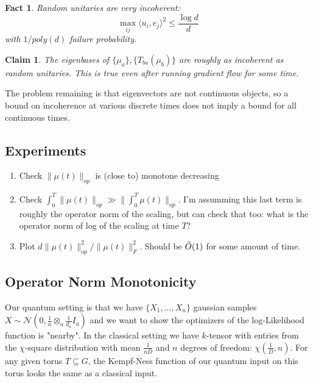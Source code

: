 \documentclass{article}
\newtheorem{fact}[theorem]{Fact}
\newtheorem{claim}[theorem]{Claim}
\newcommand\cN{\mathcal{N}}
\begin{document}
\begin{fact}
Random unitaries are very incoherent:
\[ \max_{ij} \langle u_{i}, e_{j} \rangle^{2} \leq \frac{\log d}{d}    \]
with $1/poly(d)$ failure probability.
\end{fact}

\begin{claim}
The eigenbases of $\{\mu_{a}\}, \{T_{ba}(\mu_{b})\}$ are roughly as incoherent as random unitaries. This is true even after running gradient flow for some time.
\end{claim}

The problem remaining is that eigenvectors are not continuous objects, so a bound on incoherence at various discrete times does not imply a bound for all continuous times.







\subsection{Experiments}
\begin{enumerate}
    \item Check $\|\mu(t)\|_{op}$ is (close to) monotone decreasing
    \item Check $\int_{0}^{T} \|\mu(t)\|_{op} \gg \|\int_{0}^{T} \mu(t)\|_{op}$. I'm assumming this last term is roughly the operator norm of the scaling, but can check that too: what is the operator norm of log of the scaling at time $T$?
    \item Plot $d \|\mu(t)\|_{op}^{2} / \|\mu(t)\|_{F}^{2}$. Should be $\Tilde{O}(1)$ for some amount of time.
\end{enumerate}


\subsection{Operator Norm Monotonicity}

Our quantum setting is that we have $\{X_{1}, ..., X_{n}\}$ gaussian samples $X \sim \cN(0, \frac{1}{n} \otimes_{a} \frac{1}{d_{a}} I_{a})$ and we want to show the optimizers of the log-Likelihood function is "nearby". In the classical setting we have $k$-tensor with entries from the $\chi$-square distribution with mean $\frac{1}{nD}$ and $n$ degrees of freedom: $\chi(\frac{1}{D},n)$. For any given torus $T \subseteq G$, the Kempf-Ness function of our quantum input on this torus looks the same as a classical input.
\end{document}
